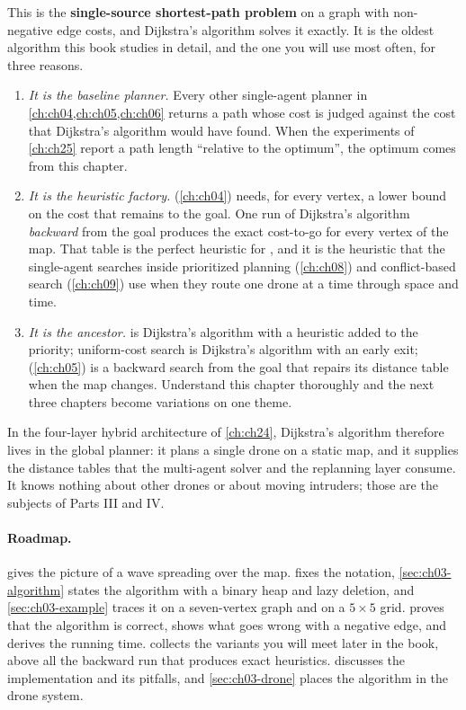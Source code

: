 This is the \textbf{single-source shortest-path problem} on a
graph with non-negative edge costs, and Dijkstra's algorithm \cite{dijkstra1959note} solves it
exactly. It is the oldest algorithm this book studies in detail, and the one you will use
most often, for three reasons.
\begin{enumerate}
  \item \emph{It is the baseline planner.} Every other single-agent planner in
\cref{ch:ch04,ch:ch05,ch:ch06} returns a path whose cost is judged against the cost that
Dijkstra's algorithm would have found. When the experiments of \cref{ch:ch25} report a path
length ``relative to the optimum'', the optimum comes from this chapter.
  \item \emph{It is the heuristic factory.} \astar (\cref{ch:ch04}) needs, for every vertex, a
lower bound on the cost that remains to the goal. One run of Dijkstra's algorithm
\emph{backward} from the goal produces the exact cost-to-go for every vertex of the map. That
table is the perfect heuristic for \astar, and it is the heuristic that the single-agent
searches inside prioritized planning (\cref{ch:ch08}) and conflict-based search (\cref{ch:ch09})
use when they route one drone at a time through space and time.
  \item \emph{It is the ancestor.} \astar is Dijkstra's algorithm with a heuristic added to the
priority; uniform-cost search is Dijkstra's algorithm with an early exit; \dstarlite
(\cref{ch:ch05}) is a backward search from the goal that repairs its distance table when the map
changes. Understand this chapter thoroughly and the next three chapters become variations on one
theme.
\end{enumerate}

In the four-layer hybrid architecture of \cref{ch:ch24}, Dijkstra's algorithm therefore lives in
the global planner: it plans a single drone on a static map, and it supplies the distance
tables that the multi-agent solver and the replanning layer consume. It knows nothing about
other drones or about moving intruders; those are the subjects of Parts III and IV.

\paragraph{Roadmap.}  gives the picture of a wave spreading over the
map.  fixes the notation, \cref{sec:ch03-algorithm} states the algorithm
with a binary heap and lazy deletion, and \cref{sec:ch03-example} traces it on a seven-vertex
graph and on a $5\times5$ grid.  proves that the algorithm is correct,
shows what goes wrong with a negative edge, and derives the running time.
 collects the variants you will meet later in the book, above all the
backward run that produces exact heuristics.  discusses the
\python implementation and its pitfalls, and \cref{sec:ch03-drone} places the algorithm in the
drone system.

